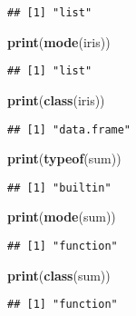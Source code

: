 \documentclass[]{article}
\newenvironment{Shaded}{\begin{snugshade}}{\end{snugshade}}
\newcommand{\KeywordTok}[1]{\textcolor[rgb]{0.13,0.29,0.53}{\textbf{#1}}}
\newcommand{\NormalTok}[1]{#1}
\begin{document}
\begin{verbatim}
## [1] "list"
\end{verbatim}

\begin{Shaded}
\begin{Highlighting}[]
\KeywordTok{print}\NormalTok{(}\KeywordTok{mode}\NormalTok{(iris))}
\end{Highlighting}
\end{Shaded}

\begin{verbatim}
## [1] "list"
\end{verbatim}

\begin{Shaded}
\begin{Highlighting}[]
\KeywordTok{print}\NormalTok{(}\KeywordTok{class}\NormalTok{(iris))}
\end{Highlighting}
\end{Shaded}

\begin{verbatim}
## [1] "data.frame"
\end{verbatim}

\begin{Shaded}
\begin{Highlighting}[]
\KeywordTok{print}\NormalTok{(}\KeywordTok{typeof}\NormalTok{(sum))}
\end{Highlighting}
\end{Shaded}

\begin{verbatim}
## [1] "builtin"
\end{verbatim}

\begin{Shaded}
\begin{Highlighting}[]
\KeywordTok{print}\NormalTok{(}\KeywordTok{mode}\NormalTok{(sum))}
\end{Highlighting}
\end{Shaded}

\begin{verbatim}
## [1] "function"
\end{verbatim}

\begin{Shaded}
\begin{Highlighting}[]
\KeywordTok{print}\NormalTok{(}\KeywordTok{class}\NormalTok{(sum))}
\end{Highlighting}
\end{Shaded}

\begin{verbatim}
## [1] "function"
\end{verbatim}
\end{document}
